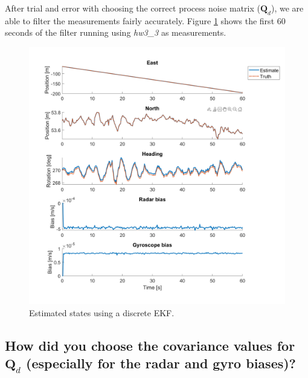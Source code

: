 \documentclass[12pt,letterpaper, onecolumn]{exam}
\begin{document}
\begin{questions}
{        After trial and error with choosing the correct process noise matrix ($\mathbf{Q}_d$), we are able to filter the measurements fairly accurately. Figure \ref{fig:Q3} shows the first 60 seconds of the filter running using \textit{hw3\_3} as measurements.

        \begin{figure}[!h]
            \centering
            \includegraphics[width=.75\linewidth]{Q3filter.png}
            \caption{Estimated states using a discrete EKF.}
            \label{fig:Q3}
        \end{figure}
        \clearpage
    }
    \begin{parts}
        \part{How did you choose the covariance values for $\mathbf{Q}_d$ (especially for the radar and gyro biases)?}

        \clearpage

\end{parts}
\end{questions}
\end{document}
